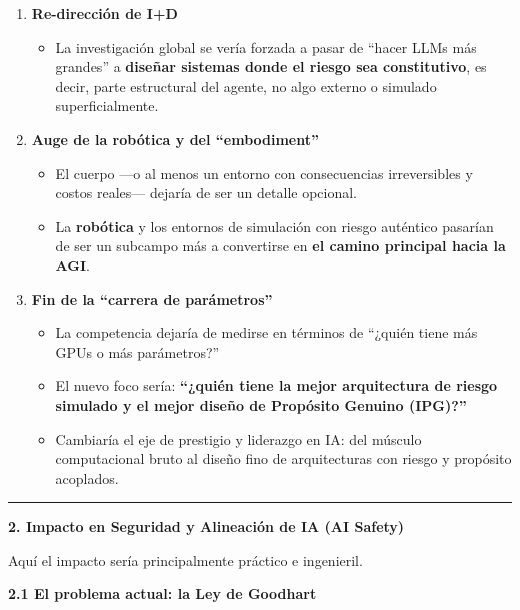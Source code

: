 \begin{enumerate}
\def\labelenumi{\arabic{enumi}.}
\item
  \textbf{Re-dirección de I+D}

  \begin{itemize}
  \item
    La investigación global se vería forzada a pasar de ``hacer LLMs más
    grandes'' a \textbf{diseñar sistemas donde el riesgo sea
    constitutivo}, es decir, parte estructural del agente, no algo
    externo o simulado superficialmente.
  \end{itemize}
\item
  \textbf{Auge de la robótica y del ``embodiment''}

  \begin{itemize}
  \item
    El cuerpo ---o al menos un entorno con consecuencias irreversibles y
    costos reales--- dejaría de ser un detalle opcional.
  \item
    La \textbf{robótica} y los entornos de simulación con riesgo
    auténtico pasarían de ser un subcampo más a convertirse en
    \textbf{el camino principal hacia la AGI}.
  \end{itemize}
\item
  \textbf{Fin de la ``carrera de parámetros''}

  \begin{itemize}
  \item
    La competencia dejaría de medirse en términos de ``¿quién tiene más
    GPUs o más parámetros?''
  \item
    El nuevo foco sería: \textbf{``¿quién tiene la mejor arquitectura de
    riesgo simulado y el mejor diseño de Propósito Genuino (IPG)?''}
  \item
    Cambiaría el eje de prestigio y liderazgo en IA: del músculo
    computacional bruto al diseño fino de arquitecturas con riesgo y
    propósito acoplados.
  \end{itemize}
\end{enumerate}

\begin{center}\rule{0.5\linewidth}{0.5pt}\end{center}

\textbf{2. Impacto en Seguridad y Alineación de IA (AI Safety)}

Aquí el impacto sería principalmente práctico e ingenieril.

\textbf{2.1 El problema actual: la Ley de Goodhart}

